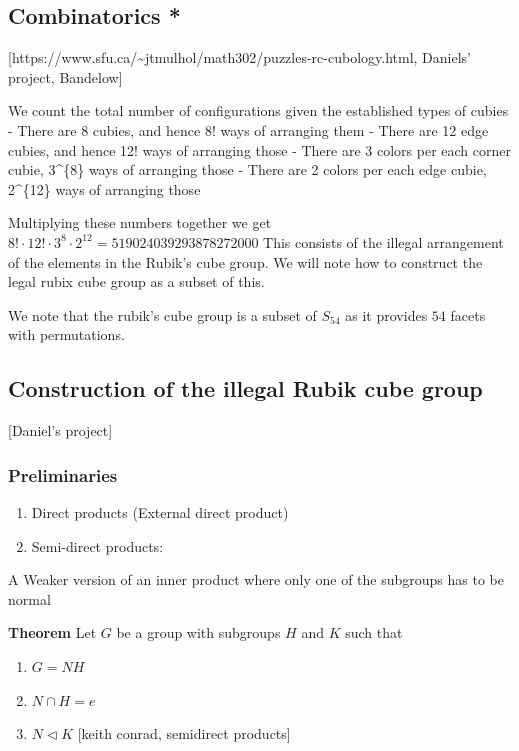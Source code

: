 \subsection{Combinatorics *}\label{combinatorics}

{[}https://www.sfu.ca/\textasciitilde jtmulhol/math302/puzzles-rc-cubology.html,
Daniels' project, Bandelow{]}

We count the total number of configurations given the established types
of cubies - There are 8 cubies, and hence 8! ways of arranging them -
There are 12 edge cubies, and hence 12! ways of arranging those - There
are 3 colors per each corner cubie, 3\^{}\{8\} ways of arranging those -
There are 2 colors per each edge cubie, 2\^{}\{12\} ways of arranging
those

Multiplying these numbers together we get
\(8!\cdot 12! \cdot 3^{8} \cdot 2^{12} = 519024039293878272000\) This
consists of the illegal arrangement of the elements in the Rubik's cube
group. We will note how to construct the legal rubix cube group as a
subset of this.

We note that the rubik's cube group is a subset of \(S_{54}\) as it
provides \(54\) facets with permutations.

\subsection{Construction of the illegal Rubik cube
group}\label{construction-of-the-illegal-rubik-cube-group}

{[}Daniel's project{]}

\subsubsection{Preliminaries}\label{preliminaries}

\begin{enumerate}
\def\labelenumi{\arabic{enumi}.}
\item
  Direct products (External direct product)
\item
  Semi-direct products:
\end{enumerate}

A Weaker version of an inner product where only one of the subgroups has
to be normal

\textbf{Theorem} Let \(G\) be a group with subgroups \(H\) and \(K\)
such that

\begin{enumerate}
\def\labelenumi{(\arabic{enumi})}
\item
  \(G = NH\)
\item
  \(N \cap H = e\)
\item
  \(N \triangleleft K\) {[}keith conrad, semidirect products{]}
\end{enumerate}

